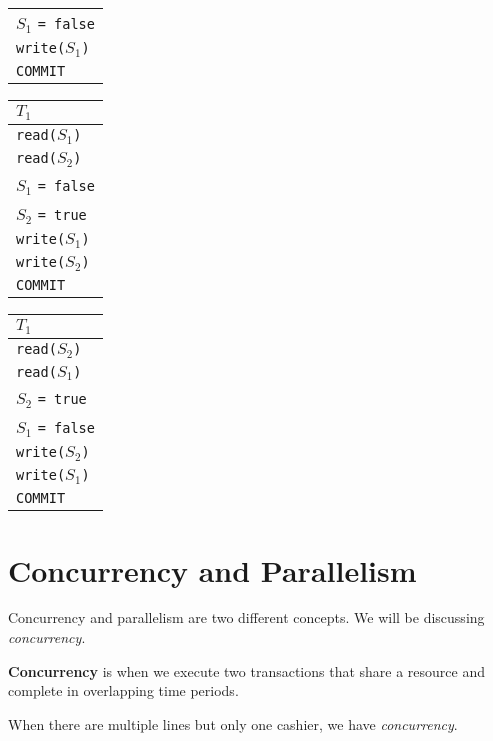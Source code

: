\documentclass{report}
\newenvironment{definition}[1]{\begin{tcolorbox}[title={Definition: #1}]}{\end{tcolorbox}}
\newenvironment{example}{\begin{tcolorbox}[title={Example},colback=green!5!white,colframe=black!75!green]}{\end{tcolorbox}}
\renewcommand{\bf}[1]{\textbf{{#1}}}
\renewcommand{\tt}[1]{\texttt{{#1}}}
\renewcommand{\it}[1]{\textit{{#1}}}
\begin{document}
\begin{example}
{\begin{tabular}{l}
            $S_1$ \tt{= false} \\
            \tt{write($S_1$)} \\
            \tt{COMMIT}
        \end{tabular}
        \hspace{1em}
        \begin{tabular}{l}
            $T_1$ \\
            \hline
            \tt{read($S_1$)} \\
            \tt{read($S_2$)} \\
            $S_1$ \tt{= false} \\
            $S_2$ \tt{= true} \\
            \tt{write($S_1$)} \\
            \tt{write($S_2$)} \\
            \tt{COMMIT}
        \end{tabular}
        \hspace{1em}
        \begin{tabular}{l}
            $T_1$ \\
            \hline
            \tt{read($S_2$)} \\
            \tt{read($S_1$)} \\
            $S_2$ \tt{= true} \\
            $S_1$ \tt{= false} \\
            \tt{write($S_2$)} \\
            \tt{write($S_1$)} \\
            \tt{COMMIT}
        \end{tabular}
        \par
    }
\end{example}

\section{Concurrency and Parallelism}
Concurrency and parallelism are two different concepts. We will be discussing
\it{concurrency}.
\begin{definition}{Concurrency}
    \bf{Concurrency} is when we execute two transactions that share a resource
    and complete in overlapping time periods.
\end{definition}
\begin{example}
    When there are multiple lines but only one cashier, we have
    \it{concurrency}.
\end{example}
\end{document}
